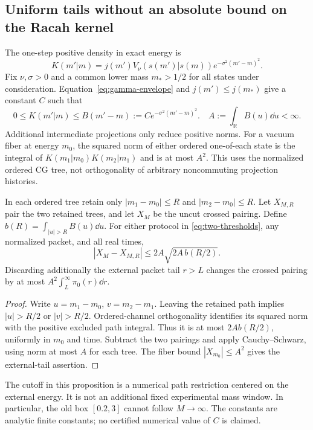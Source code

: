 \subsection{Uniform tails without an absolute bound on the Racah kernel}
The one-step positive density in exact energy is
\begin{equation}
 K(m'|m)=j(m')V_\nu(s(m')|s(m))
                  e^{-\sigma^2(m'-m)^2}.
 \label{eq:energy-positive-kernel}
\end{equation}
Fix $\nu,\sigma>0$ and a common lower mass $m_*>1/2$ for all states
under consideration. Equation~\eqref{eq:gamma-envelope} and
$j(m')\le j(m_*)$ give a constant $C$ such that
\begin{equation}
 0\le K(m'|m)\le B(m'-m):=C e^{-\sigma^2(m'-m)^2}.
 \quad A:=\int_{\mathbb R}B(u)\dd u<\infty.
 \label{eq:uniform-energy-envelope}
\end{equation}
Additional intermediate projections only reduce positive norms.
For a vacuum fiber at energy $m_0$, the squared norm of either ordered
one-of-each state is the integral of
$K(m_1|m_0)K(m_2|m_1)$ and is at most $A^2$.
This uses the normalized ordered CG tree, not orthogonality of arbitrary
noncommuting projection histories.

\begin{proposition}
In each ordered tree retain only
$|m_1-m_0|\le R$ and $|m_2-m_0|\le R$. Let $X_{M,R}$ pair the two
retained trees, and let $X_M$ be the uncut crossed pairing. Define
$b(R)=\int_{|u|>R}B(u)\dd u$. For either protocol in
\eqref{eq:two-thresholds}, any normalized packet, and all real times,
\begin{equation}
 |X_M-X_{M,R}|\le 2A\sqrt{2A\,b(R/2)}.
 \label{eq:uniform-cross-tail}
\end{equation}
Discarding additionally the external packet tail $r>L$ changes the
crossed pairing by at most
$A^2\int_L^\infty\pi_0(r)\dd r$.
\label{prop:uniform-cross-tail}
\end{proposition}
\begin{proof}
Write $u=m_1-m_0$, $v=m_2-m_1$. Leaving the retained path implies
$|u|>R/2$ or $|v|>R/2$. Ordered-channel orthogonality identifies its
squared norm with the positive excluded path integral. Thus it is at
most $2A b(R/2)$, uniformly in $m_0$ and time. Subtract the two pairings
and apply Cauchy--Schwarz, using norm at most $A$ for each tree.
The fiber bound $|X_{m_0}|\le A^2$ gives the external-tail assertion.
\end{proof}
The cutoff in this proposition is a numerical path restriction centered
on the external energy. It is not an additional fixed experimental mass
window. In particular, the old box $[0.2,3]$ cannot follow $M\to\infty$.
The constants are analytic finite constants; no certified numerical
value of $C$ is claimed.

